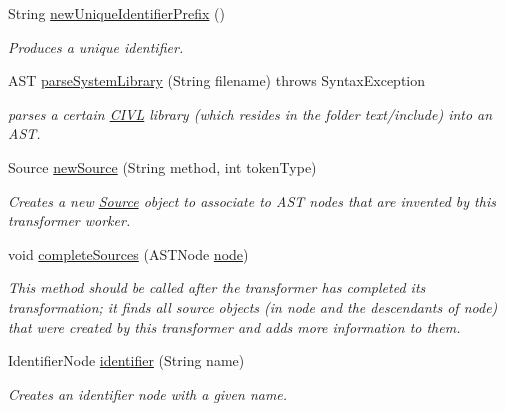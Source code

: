 \begin{DoxyCompactItemize}
\item 
String \hyperlink{classedu_1_1udel_1_1cis_1_1vsl_1_1civl_1_1transform_1_1common_1_1BaseWorker_a54d8757137b5b447ecf9519c9768107b}{new\+Unique\+Identifier\+Prefix} ()
\begin{DoxyCompactList}\small\item\em Produces a unique identifier. \end{DoxyCompactList}\item 
A\+S\+T \hyperlink{classedu_1_1udel_1_1cis_1_1vsl_1_1civl_1_1transform_1_1common_1_1BaseWorker_aa2a48e284d7eb6f96e72b75015685de8}{parse\+System\+Library} (String filename)  throws Syntax\+Exception 
\begin{DoxyCompactList}\small\item\em parses a certain \hyperlink{classedu_1_1udel_1_1cis_1_1vsl_1_1civl_1_1CIVL}{C\+I\+V\+L} library (which resides in the folder text/include) into an A\+S\+T. \end{DoxyCompactList}\item 
Source \hyperlink{classedu_1_1udel_1_1cis_1_1vsl_1_1civl_1_1transform_1_1common_1_1BaseWorker_a45d64b7e09a96de3fe161198a0ad8f5a}{new\+Source} (String method, int token\+Type)
\begin{DoxyCompactList}\small\item\em Creates a new \hyperlink{}{Source} object to associate to A\+S\+T nodes that are invented by this transformer worker. \end{DoxyCompactList}\item 
void \hyperlink{classedu_1_1udel_1_1cis_1_1vsl_1_1civl_1_1transform_1_1common_1_1BaseWorker_a6e4863b6255d4f5be905a6b989d868f5}{complete\+Sources} (A\+S\+T\+Node \hyperlink{structnode}{node})
\begin{DoxyCompactList}\small\item\em This method should be called after the transformer has completed its transformation; it finds all source objects (in node and the descendants of node) that were created by this transformer and adds more information to them. \end{DoxyCompactList}\item 
Identifier\+Node \hyperlink{classedu_1_1udel_1_1cis_1_1vsl_1_1civl_1_1transform_1_1common_1_1BaseWorker_a336cc5e1bfb1136816ef3eb2d0615a27}{identifier} (String name)
\begin{DoxyCompactList}\small\item\em Creates an identifier node with a given name. \end{DoxyCompactList}\item 

\end{DoxyCompactItemize}
